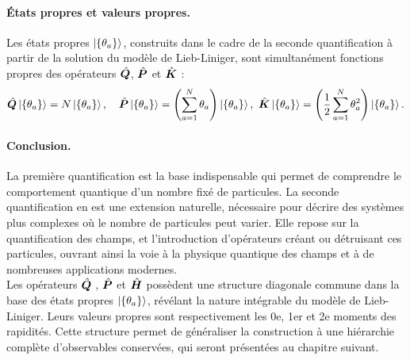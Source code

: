 \paragraph{États propres et valeurs propres.}
Les états propres $\ket{\{\theta_a\}}$, construits dans le cadre de la seconde quantification à partir de la solution du modèle de Lieb-Liniger, sont simultanément fonctions propres des opérateurs $\hat{\bm{Q}}$, $\hat{\bm{P}}$ et $\hat{\bm{K}}$ :
\begin{eqnarray}
\hat{\bm{Q}} \ket{\{\theta_a\}} = N \ket{\{\theta_a\}}, \quad
\hat{\bm{P}} \ket{\{\theta_a\}} = \left( \sum_{a=1}^N \theta_a \right) \ket{\{\theta_a\}}, \
\hat{\bm{K}} \ket{\{\theta_a\}} = \left( \frac{1}{2} \sum_{a=1}^N \theta_a^2 \right) \ket{\{\theta_a\}}.
\end{eqnarray}

\paragraph*{Conclusion.}

La première quantification est la base indispensable qui permet de comprendre le comportement quantique d’un nombre fixé de particules. La seconde quantification en est une extension naturelle, nécessaire pour décrire des systèmes plus complexes où le nombre de particules peut varier. Elle repose sur la quantification des champs, et l’introduction d’opérateurs créant ou détruisant ces particules, ouvrant ainsi la voie à la physique quantique des champs et à de nombreuses applications modernes.\\

Les opérateurs $\hat{\bm{Q}}$ , $\hat{\bm{P}}$ et $\hat{\bm{H}}$ possèdent une structure diagonale commune dans la base des états propres $\ket{\{\theta_a\}}$, révélant la nature intégrable du modèle de Lieb-Liniger. Leurs valeurs propres sont respectivement les 0e, 1er et 2e moments des rapidités. Cette structure permet de généraliser la construction à une hiérarchie complète d’observables conservées, qui seront présentées au chapitre suivant.


